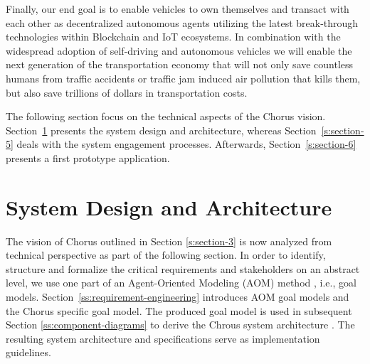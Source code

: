 \documentclass{llncs}
\begin{document}
{		Finally, our end goal is to enable vehicles to own themselves and transact with each other as decentralized autonomous agents utilizing the latest break-through technologies within Blockchain and IoT ecosystems.	In combination with the widespread adoption of self-driving and autonomous vehicles we will enable the next generation of the transportation economy that will not only save countless humans from traffic accidents or traffic jam induced air pollution that kills them, but also save trillions of dollars in transportation costs. 
	
		The following section focus on the technical aspects of the Chorus vision. Section~\ref{s:section-4} presents the system design and architecture, whereas Section~\ref{s:section-5} deals with the system engagement processes. Afterwards, Section~\ref{s:section-6} presents a first prototype application.

	
	
	\section{System Design and Architecture}
		\label{s:section-4}	


		The vision of Chorus outlined in Section \ref{s:section-3} is now analyzed from technical perspective as part of the following section. In order to identify, structure and formalize the critical requirements and stakeholders on an abstract level, we use one part of an Agent-Oriented Modeling (AOM) method \cite{sterling2009art}, i.e., goal models. Section~\ref{ss:requirement-engineering} introduces AOM goal models and the Chorus specific goal model. The produced goal model is used in subsequent Section \ref{ss:component-diagrams} to derive the Chrous system architecture . The resulting system architecture and specifications serve as implementation guidelines. 
		
		
		
}
\end{document}
